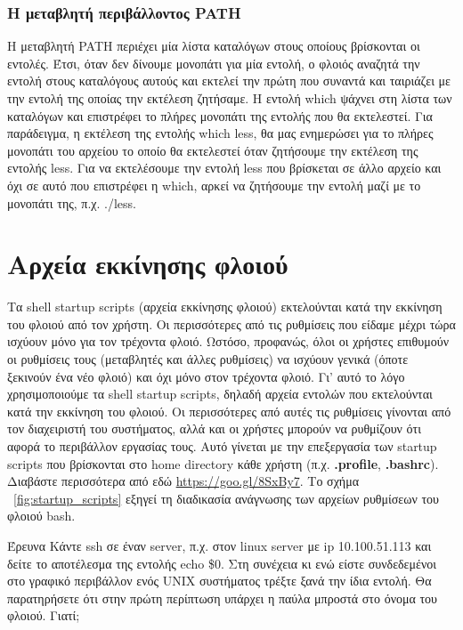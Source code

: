 \subsubsection{Η μεταβλητή περιβάλλοντος PATH}

Η μεταβλητή PATH περιέχει μία λίστα καταλόγων στους οποίους βρίσκονται οι εντολές. Έτσι, όταν δεν δίνουμε μονοπάτι για μία εντολή, ο φλοιός
αναζητά την εντολή στους
καταλόγους αυτούς και εκτελεί την πρώτη που συναντά και ταιριάζει με την εντολή της οποίας την εκτέλεση ζητήσαμε.
Η εντολή which ψάχνει στη λίστα των καταλόγων και επιστρέφει το πλήρες μονοπάτι της εντολής που θα εκτελεστεί. Για παράδειγμα, η εκτέλεση
της εντολής which less, θα μας ενημερώσει για το πλήρες μονοπάτι του αρχείου το οποίο θα εκτελεστεί όταν ζητήσουμε την εκτέλεση της εντολής
less. Για να εκτελέσουμε την εντολή less που βρίσκεται σε άλλο αρχείο και όχι σε αυτό που επιστρέφει η which, αρκεί να ζητήσουμε την εντολή
μαζί με το μονοπάτι της, π.χ. ./less.

\section{Αρχεία εκκίνησης φλοιού}

Τα shell startup scripts (αρχεία εκκίνησης φλοιού) εκτελούνται κατά την εκκίνηση του φλοιού από τον χρήστη. Οι περισσότερες από τις
ρυθμίσεις που είδαμε μέχρι τώρα ισχύουν μόνο για τον τρέχοντα φλοιό. Ωστόσο, προφανώς, όλοι οι χρήστες επιθυμούν οι ρυθμίσεις τους
(μεταβλητές και άλλες ρυθμίσεις) να ισχύουν γενικά (όποτε ξεκινούν ένα νέο φλοιό) και όχι μόνο στον τρέχοντα φλοιό. Γι’ αυτό το λόγο
χρησιμοποιούμε τα shell startup scripts, δηλαδή αρχεία εντολών που εκτελούνται κατά την εκκίνηση του φλοιού. Οι περισσότερες από αυτές τις
ρυθμίσεις γίνονται από τον διαχειριστή του συστήματος, αλλά και οι χρήστες μπορούν να ρυθμίζουν ότι αφορά το περιβάλλον εργασίας τους. Αυτό
γίνεται με την επεξεργασία των startup scripts που βρίσκονται στο home directory κάθε χρήστη (π.χ. \textbf{.profile}, \textbf{.bashrc}). Διαβάστε περισσότερα από εδώ \href{https://goo.gl/8SxBy7}{https://goo.gl/8SxBy7}. Το σχήμα ~\ref{fig:startup_scripts} εξηγεί τη διαδικασία ανάγνωσης των αρχείων ρυθμίσεων του φλοιού bash.

\begin{exercisebox}{  Έρευνα}
Κάντε ssh σε έναν server, π.χ. στον linux server με ip 10.100.51.113 και δείτε το αποτέλεσμα της εντολής echo \$0. Στη συνέχεια κι ενώ είστε συνδεδεμένοι στο γραφικό περιβάλλον ενός UNIX συστήματος τρέξτε ξανά την ίδια εντολή. Θα παρατηρήσετε ότι στην πρώτη περίπτωση υπάρχει η παύλα μπροστά στο όνομα του φλοιού. Γιατί;
\end{exercisebox}


